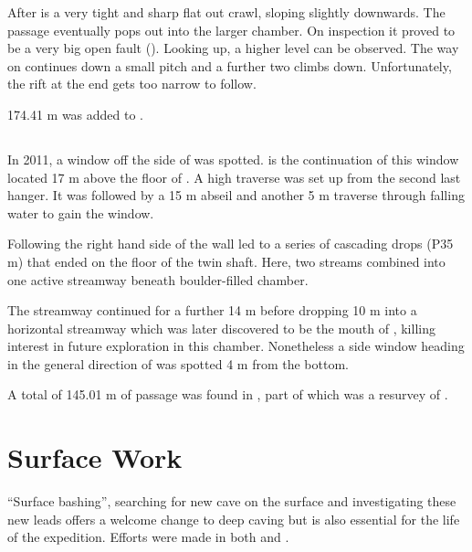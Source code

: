 After  is a very tight and sharp flat out crawl,
sloping slightly downwards. The passage eventually pops out into the
larger chamber. On inspection it proved to be a very big open fault
(). Looking up, a higher level can be observed. The way on
continues down a small pitch and a further two climbs down.
Unfortunately, the rift at the end gets too narrow to follow.

174.41 m was added to .


\subsection{}

In 2011, a window off the side of  was
spotted.  is the continuation of this window located
17 m above the floor of . A high traverse was set up from the
second last hanger. It was followed by a 15 m abseil and another 5 m
traverse through falling water to gain the window.

Following the right hand side of the wall led to a series of cascading
drops (P35 m) that ended on the floor of the twin shaft. Here, two
streams combined into one active streamway beneath boulder-filled
chamber.

The streamway continued for a further 14 m before dropping 10 m into a
horizontal streamway which was later discovered to be the mouth of
, killing interest in future exploration in this
chamber. Nonetheless a side window heading in the general direction of
 was spotted 4 m from the bottom.

A total of 145.01 m of passage was found in , part of
which was a resurvey of .

\section{Surface Work}

“Surface bashing”, searching for new cave on the surface and investigating these new leads offers a welcome change to deep caving but is also essential for the life of the expedition. Efforts were made in both  and .

\subsection{}

